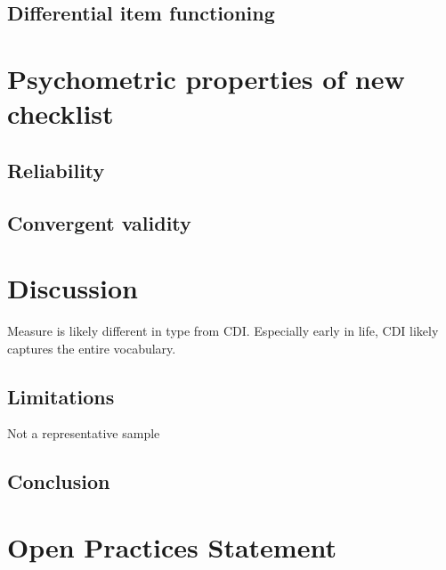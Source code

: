 \documentclass[
  man,floatsintext]{apa6}
\begin{document}
\hypertarget{differential-item-functioning}{%
\subsection{Differential item functioning}\label{differential-item-functioning}}

\hypertarget{psychometric-properties-of-new-checklist}{%
\section{Psychometric properties of new checklist}\label{psychometric-properties-of-new-checklist}}

\hypertarget{reliability}{%
\subsection{Reliability}\label{reliability}}

\hypertarget{convergent-validity}{%
\subsection{Convergent validity}\label{convergent-validity}}

\hypertarget{discussion}{%
\section{Discussion}\label{discussion}}

Measure is likely different in type from CDI. Especially early in life, CDI likely captures the entire vocabulary.

\hypertarget{limitations}{%
\subsection{Limitations}\label{limitations}}

Not a representative sample

\hypertarget{conclusion}{%
\subsection{Conclusion}\label{conclusion}}

\hypertarget{open-practices-statement}{%
\section{Open Practices Statement}\label{open-practices-statement}}
\end{document}
